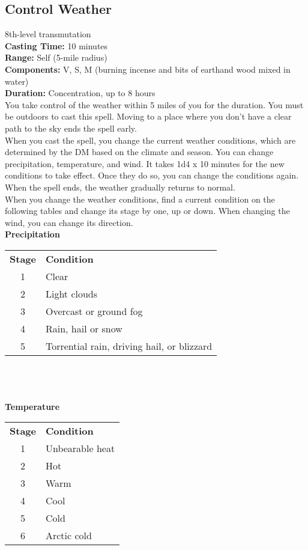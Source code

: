 \documentclass[11pt, A4paper, english]{article}
\begin{document}
		\subsection{Control Weather}
8th-level transmutation \\
\textbf{Casting Time:} 10 minutes \\
\textbf{Range:} Self (5-mile radius) \\
\textbf{Components:} V, S, M (burning incense and bits of earthand wood mixed in water) \\
\textbf{Duration:} Concentration, up to 8 hours \\
You take control of the weather within 5 miles of you for the duration. You must be outdoors to cast this spell. Moving to a place where you don’t have a clear path to the sky ends the spell early. \\
When you cast the spell, you change the current weather conditions, which are determined by the DM based on the climate and season. You can change precipitation, temperature, and wind. It takes 1d4 x 10 minutes for the new conditions to take effect. Once they do so, you can change the conditions again. When the spell ends, the weather gradually returns to normal. \\
When you change the weather conditions, find a current condition on the following tables and change its stage by one, up or down. When changing the wind, you can change its direction. \\
\Large \textbf{Precipitation} \\
			\begin{tabular}{cl}
\textbf{Stage} & \textbf{Condition} \\
1 & Clear \\
2 & Light clouds \\
3 & Overcast or ground fog \\
4 & Rain, hail or snow \\
5 & Torrential rain, driving hail, or blizzard
			\end{tabular} \\
 \\
 \\
\Large \textbf{Temperature} \\
			\begin{tabular}{cl}
\textbf{Stage} & \textbf{Condition} \\
1 & Unbearable heat \\
2 & Hot \\
3 & Warm \\
4 & Cool \\
5 & Cold \\
6 & Arctic cold
			\end{tabular} \\
\end{document}
